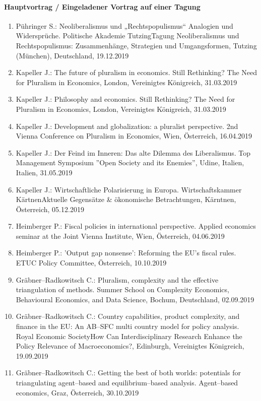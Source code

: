 \paragraph{Hauptvortrag / Eingeladener Vortrag auf einer Tagung}
\begin{enumerate}
	\item Pühringer S.: Neoliberalismus und „Rechtspopulismus“ Analogien und Widersprüche. Politische Akademie TutzingTagung Neoliberalismus und Rechtspopulismus: Zusammenhänge, Strategien und Umgangsformen, Tutzing (München), Deutschland, 19.12.2019
	\item Kapeller J.: The future of pluralism in economics. Still Rethinking? The Need for Pluralism in Economics, London, Vereinigtes Königreich, 31.03.2019
	\item Kapeller J.: Philosophy and economics. Still Rethinking? The Need for Pluralism in Economics, London, Vereinigtes Königreich, 31.03.2019
	\item Kapeller J.: Development and globalization: a pluralist perspective. 2nd Vienna Conference on Pluralism in Economics, Wien, Österreich, 16.04.2019
	\item Kapeller J.: Der Feind im Inneren: Das alte Dilemma des Liberalismus. Top Management Symposium ''Open Society and its Enemies'', Udine, Italien, Italien, 31.05.2019
	\item Kapeller J.: Wirtschaftliche Polarisierung in Europa. Wirtschaftskammer KärtnenAktuelle Gegensätze \& ökonomische Betrachtungen, Kärntnen, Österreich, 05.12.2019
	\item Heimberger P.: Fiscal policies in international perspective. Applied economics seminar at the Joint Vienna Institute, Wien, Österreich, 04.06.2019
	\item Heimberger P.: 'Output gap nonsense': Reforming the EU's fiscal rules. ETUC Policy Committee, Österreich, 10.10.2019
	\item Gräbner--Radkowitsch C.: Pluralism, complexity and the effective triangulation of methods. Summer School on Complexity Economics, Behavioural Economics, and Data Science, Bochum, Deutschland, 02.09.2019
	\item Gräbner--Radkowitsch C.: Country capabilities, product complexity, and finance in the EU: An AB--SFC multi country model for policy analysis. Royal Economic SocietyHow Can Interdisciplinary Research Enhance the Policy Relevance of Macroeconomics?, Edinburgh, Vereinigtes Königreich, 19.09.2019
	\item Gräbner--Radkowitsch C.: Getting the best of both worlds: potentials for triangulating agent--based and equilibrium--based analysis. Agent--based economics, Graz, Österreich, 30.10.2019
\end{enumerate}
